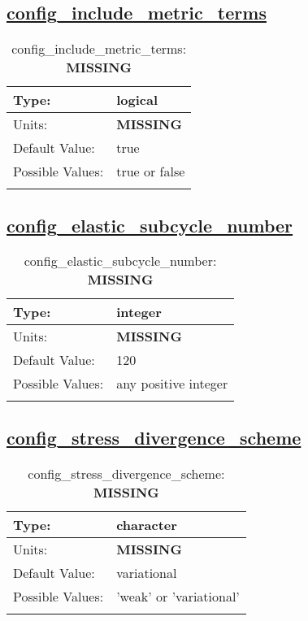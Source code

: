 \subsection[config\_include\_metric\_terms]{\hyperref[sec:nm_tab_velocity_solver]{config\_include\_metric\_terms}}
\label{subsec:nm_sec_config_include_metric_terms}
\begin{center}
\begin{longtable}{| p{2.0in} || p{4.0in} |}
    \hline
    Type: & logical \\
    \hline
    Units: & {\bf \color{red} MISSING} \\
    \hline
    Default Value: & true \\
    \hline
    Possible Values: & true or false \\
    \hline
    \caption{config\_include\_metric\_terms: {\bf \color{red} MISSING}}
\end{longtable}
\end{center}
\subsection[config\_elastic\_subcycle\_number]{\hyperref[sec:nm_tab_velocity_solver]{config\_elastic\_subcycle\_number}}
\label{subsec:nm_sec_config_elastic_subcycle_number}
\begin{center}
\begin{longtable}{| p{2.0in} || p{4.0in} |}
    \hline
    Type: & integer \\
    \hline
    Units: & {\bf \color{red} MISSING} \\
    \hline
    Default Value: & 120 \\
    \hline
    Possible Values: & any positive integer \\
    \hline
    \caption{config\_elastic\_subcycle\_number: {\bf \color{red} MISSING}}
\end{longtable}
\end{center}
\subsection[config\_stress\_divergence\_scheme]{\hyperref[sec:nm_tab_velocity_solver]{config\_stress\_divergence\_scheme}}
\label{subsec:nm_sec_config_stress_divergence_scheme}
\begin{center}
\begin{longtable}{| p{2.0in} || p{4.0in} |}
    \hline
    Type: & character \\
    \hline
    Units: & {\bf \color{red} MISSING} \\
    \hline
    Default Value: & variational \\
    \hline
    Possible Values: & 'weak' or 'variational' \\
    \hline
    \caption{config\_stress\_divergence\_scheme: {\bf \color{red} MISSING}}
\end{longtable}
\end{center}
